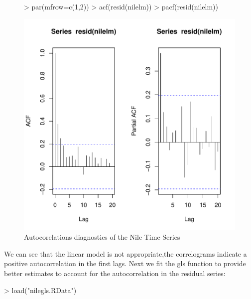 \documentclass[10pt, a4paper]{article} %
\begin{document}
\begin{figure}[H]
\centering
\begin{Schunk}
\begin{Sinput}
> par(mfrow=c(1,2))
> acf(resid(nilelm))
> pacf(resid(nilelm))
\end{Sinput}
\end{Schunk}
\includegraphics{FINAL_VERSION-086}
\caption{Autocorelations diagnostics of the Nile Time Series}
\end{figure}

\noindent We can see that the linear model is not appropriate,the correlograms indicate a positive autocorrelation in the first lags. Next we fit the gls function to provide better estimates to account for the autocorrelation in the residual series:\\
\begin{Schunk}
\end{Schunk}

\begin{Schunk}
\begin{Sinput}
> load("nilegls.RData")
\end{Sinput}
\end{Schunk}
\end{document}
